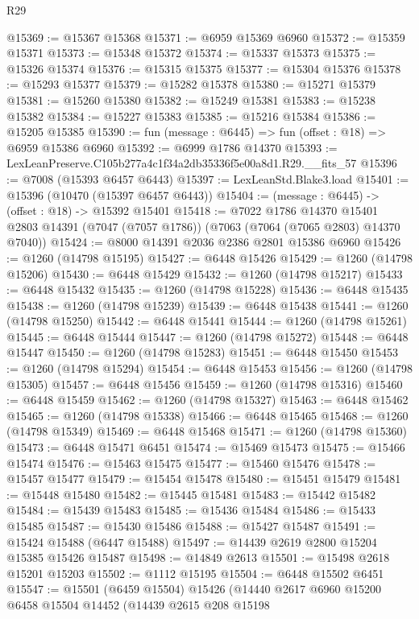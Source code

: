 \begin{lexlean}{R29}
\begin{coremodule}
@15369 := @15367 @15368
@15371 := @6959 @15369 @6960
@15372 := @15359 @15371
@15373 := @15348 @15372
@15374 := @15337 @15373
@15375 := @15326 @15374
@15376 := @15315 @15375
@15377 := @15304 @15376
@15378 := @15293 @15377
@15379 := @15282 @15378
@15380 := @15271 @15379
@15381 := @15260 @15380
@15382 := @15249 @15381
@15383 := @15238 @15382
@15384 := @15227 @15383
@15385 := @15216 @15384
@15386 := @15205 @15385
@15390 := fun (message : @6445) => fun (offset : @18) => @6959 @15386 @6960
@15392 := @6999 @1786 @14370
@15393 := LexLeanPreserve.C105b277a4c1f34a2db35336f5e00a8d1.R29.__fits_57
@15396 := @7008 (@15393 @6457 @6443)
@15397 := LexLeanStd.Blake3.load
@15401 := @15396 (@10470 (@15397 @6457 @6443))
@15404 := (message : @6445) -> (offset : @18) -> @15392 @15401
@15418 := @7022
    @1786
    @14370
    @15401
    @2803
    @14391
    (@7047 (@7057 @1786))
    (@7063 (@7064 (@7065 @2803) @14370 @7040))
@15424 := @8000 @14391 @2036 @2386 @2801 @15386 @6960
@15426 := @1260 (@14798 @15195)
@15427 := @6448 @15426
@15429 := @1260 (@14798 @15206)
@15430 := @6448 @15429
@15432 := @1260 (@14798 @15217)
@15433 := @6448 @15432
@15435 := @1260 (@14798 @15228)
@15436 := @6448 @15435
@15438 := @1260 (@14798 @15239)
@15439 := @6448 @15438
@15441 := @1260 (@14798 @15250)
@15442 := @6448 @15441
@15444 := @1260 (@14798 @15261)
@15445 := @6448 @15444
@15447 := @1260 (@14798 @15272)
@15448 := @6448 @15447
@15450 := @1260 (@14798 @15283)
@15451 := @6448 @15450
@15453 := @1260 (@14798 @15294)
@15454 := @6448 @15453
@15456 := @1260 (@14798 @15305)
@15457 := @6448 @15456
@15459 := @1260 (@14798 @15316)
@15460 := @6448 @15459
@15462 := @1260 (@14798 @15327)
@15463 := @6448 @15462
@15465 := @1260 (@14798 @15338)
@15466 := @6448 @15465
@15468 := @1260 (@14798 @15349)
@15469 := @6448 @15468
@15471 := @1260 (@14798 @15360)
@15473 := @6448 @15471 @6451
@15474 := @15469 @15473
@15475 := @15466 @15474
@15476 := @15463 @15475
@15477 := @15460 @15476
@15478 := @15457 @15477
@15479 := @15454 @15478
@15480 := @15451 @15479
@15481 := @15448 @15480
@15482 := @15445 @15481
@15483 := @15442 @15482
@15484 := @15439 @15483
@15485 := @15436 @15484
@15486 := @15433 @15485
@15487 := @15430 @15486
@15488 := @15427 @15487
@15491 := @15424 @15488 (@6447 @15488)
@15497 := @14439 @2619 @2800 @15204 @15385 @15426 @15487
@15498 := @14849 @2613
@15501 := @15498 @2618 @15201 @15203
@15502 := @1112 @15195
@15504 := @6448 @15502 @6451
@15547 := @15501
    (@6459 @15504)
    @15426
    (@14440
      @2617
      @6960
      @15200
      @6458
      @15504
      @14452
      (@14439
        @2615
        @208
        @15198

\end{coremodule}
\end{lexlean}

